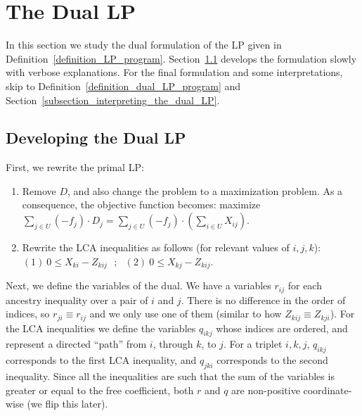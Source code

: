 \section{The Dual LP}
\label{section_dual_LP}
In this section we study the dual formulation of the LP given in Definition~\ref{definition_LP_program}. Section~\ref{subsection_developing_the_dual_LP} develops the formulation slowly with verbose explanations. For the final formulation and some interpretations, skip to Definition~\ref{definition_dual_LP_program} and Section~\ref{subsection_interpreting_the_dual_LP}.


\subsection{Developing the Dual LP}
\label{subsection_developing_the_dual_LP}
First, we rewrite the primal LP:
\begin{enumerate}
    \item Remove $D$, and also change the problem to a maximization problem. As a consequence, the objective function becomes: maximize $\sum_{j \in U}{(-f_j) \cdot D_j} = \sum_{j \in U}{(-f_j) \cdot (\sum_{i \in U}{X_{ij}})}$.
    \item Rewrite the LCA inequalities as follows (for relevant values of $i,j,k$):\\ $(1)\  0 \le X_{ki} - Z_{kij} \ \ \ ; \ \ \ (2)\  0 \le X_{kj} - Z_{kij}$.
\end{enumerate}

Next, we define the variables of the dual. We have a variables $r_{ij}$ for each ancestry inequality over a pair of $i$ and $j$. There is no difference in the order of indices, so $r_{ji} \equiv r_{ij}$ and we only use one of them (similar to how $Z_{kij} \equiv Z_{kji}$). For the LCA inequalities we define the variables $q_{ikj}$ whose indices are ordered, and represent a directed ``path'' from $i$, through $k$, to $j$. For a triplet $i,k,j$, $q_{ikj}$ corresponds to the first LCA inequality, and $q_{jki}$ corresponds to the second inequality. Since all the inequalities are such that the  sum of the variables is greater or equal to the free coefficient, both $r$ and $q$ are non-positive coordinate-wise (we flip this later).

